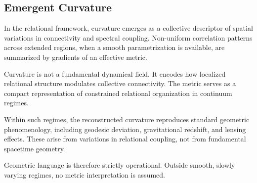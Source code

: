 \subsection{Emergent Curvature}
  \label{subsec:emergent-curvature}

  In the relational framework, curvature emerges as a collective descriptor
  of spatial variations in connectivity and spectral coupling.
  Non-uniform correlation patterns across extended regions,
  when a smooth parametrization is available,
  are summarized by gradients of an effective metric.

  Curvature is not a fundamental dynamical field.
  It encodes how localized relational structure modulates collective connectivity.
  The metric serves as a compact representation of constrained relational
  organization in continuum regimes.

  Within such regimes, the reconstructed curvature reproduces
  standard geometric phenomenology,
  including geodesic deviation, gravitational redshift,
  and lensing effects.
  These arise from variations in relational coupling,
  not from fundamental spacetime geometry.

  Geometric language is therefore strictly operational.
  Outside smooth, slowly varying regimes,
  no metric interpretation is assumed.
